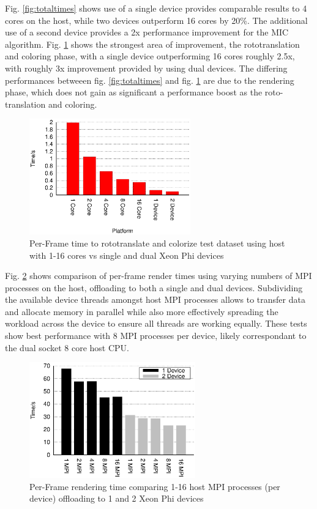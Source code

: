 \documentclass[runningheads,a4paper]{llncs}
\begin{document}
Fig. \ref{fig:totaltimes} shows use of a single device provides comparable results to 4 cores on the host, while two devices outperform 
16 cores by 20\%. The additional use of a second device provides a 2x performance improvement for the MIC algorithm. 
Fig. \ref{fig:rotocol} shows the strongest area of improvement, the rototranslation and coloring phase, with a single device 
outperforming 16 cores roughly 2.5x, with roughly 3x improvement provided by using dual devices. The differing performances betweeen 
fig. \ref{fig:totaltimes} and fig. \ref{fig:rotocol} are due to the rendering phase, which does not gain as significant a 
performance boost as the roto-translation and coloring. 

\begin{figure}
\centering
\includegraphics[height=5.0cm]{Rotocol}
\caption{Per-Frame time to rototranslate and colorize test dataset using host with 1-16 cores vs single and dual Xeon Phi devices}
\label{fig:rotocol}
\end{figure}

Fig. \ref{fig:mpitimes} shows comparison of per-frame render times using varying numbers of MPI processes on the host, offloading to 
both a single and dual devices. Subdividing the available device threads amongst host MPI processes allows to transfer data and allocate 
memory in parallel while also more effectively spreading the workload across the device to ensure all threads are working equally. 
These tests show best performance with 8 MPI processes per device, likely correspondant to the dual socket 8 core host CPU. 

\begin{figure}
\centering
\includegraphics[height=5.0cm]{MPIFrameTimes}
\caption{Per-Frame rendering time comparing 1-16 host MPI processes (per device) offloading to 1 and 2 Xeon Phi devices}
\label{fig:mpitimes}
\end{figure}
\end{document}
